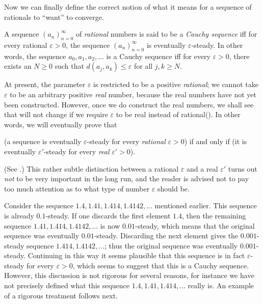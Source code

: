 Now we can finally define the correct notion of what it means for a sequence of rationals to ``want'' to converge.

\begin{definition}  \label{def 5.1.8}
A sequence \((a_n)_{n = 0}^{\infty}\) of \emph{rational} numbers is said to be a \emph{Cauchy sequence} iff for every rational \(\varepsilon > 0\), the sequence \((a_n)_{n = 0}^{\infty}\) is eventually \(\varepsilon\)-steady.
In other words, the sequence \(a_0, a_1, a_2,...\) is a Cauchy sequence iff for every \(\varepsilon > 0\), there exists an \(N \ge 0\) such that \(d(a_j, a_k) \le \varepsilon\) for all \(j, k \ge N\).
\end{definition}

\begin{remark} \label{remark 5.1.9}
At present, the parameter \(\varepsilon\) is restricted to be a positive \emph{rational};
we cannot take \(\varepsilon\) to be an arbitrary positive \emph{real} number, because the real numbers have not yet been constructed.
However, once we do construct the real numbers, we shall see that  will not change if we require \(\varepsilon\) to be real instead of rational().
In other words, we will eventually prove that
\begin{center}
    (a sequence is eventually \(\varepsilon\)-steady for every \emph{rational} \(\varepsilon > 0\)) if and only if (it is eventually \(\varepsilon'\)-steady for every \emph{real} \(\varepsilon' > 0\)).
\end{center}
(See .)
This rather subtle distinction between a rational \(\varepsilon\) and a real \(\varepsilon'\) turns out \emph{not} to be very important in the long run, and the reader is advised not to pay too much attention as to what type of number \(\varepsilon\) should be.
\end{remark}

\begin{example}  \label{example 5.1.10}
Consider the sequence \(1.4, 1.41, 1.414, 1.4142,...\) mentioned earlier.
This sequence is already \(0.1\)-steady.
If one discards the first element \(1.4\), then the remaining sequence \(1.41, 1.414, 1.4142,...\) is now \(0.01\)-steady, which means that the original sequence was eventually \(0.01\)-steady. 
Discarding the next element gives the \(0.001\)-steady sequence \(1.414, 1.4142,...\);
thus the original sequence was eventually \(0.001\)-steady. 
Continuing in this way it seems plausible that this sequence is in fact \(\varepsilon\)-steady for every \(\varepsilon > 0\), which seems to suggest that this is a Cauchy sequence.
However, this discussion is not rigorous for several reasons, for instance we have not precisely defined what this sequence \(1.4, 1.41, 1.414, \textbf{...}\) really is.
An example of a rigorous treatment follows next.
\end{example}

